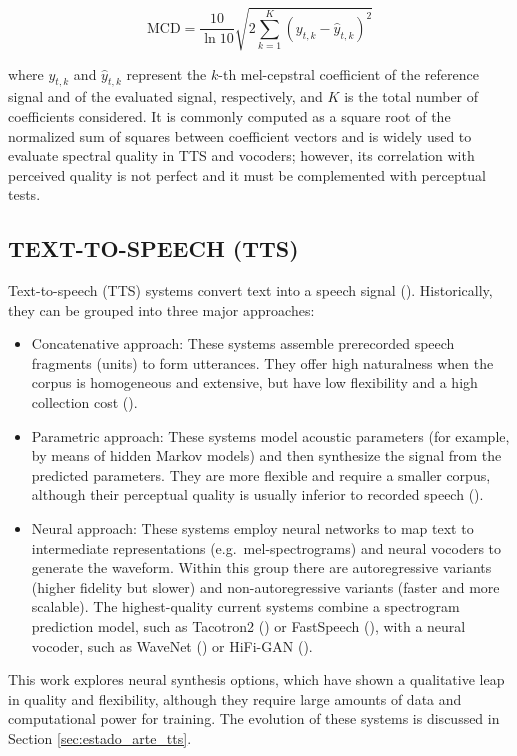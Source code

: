 \begin{equation}
    \label{eq:mcd}
    \text{MCD} = \frac{10}{\ln 10} \sqrt{2 \sum_{k=1}^{K} (y_{t,k} - \hat{y}_{t,k})^2}
\end{equation}

where $y_{t,k}$ and $\hat{y}_{t,k}$ represent the $k$-th mel-cepstral coefficient of the reference signal and of the evaluated signal, respectively, and $K$ is the total number of coefficients considered. It is commonly computed as a square root of the normalized sum of squares between coefficient vectors and is widely used to evaluate spectral quality in TTS and vocoders; however, its correlation with perceived quality is not perfect and it must be complemented with perceptual tests.

\subsection{TEXT-TO-SPEECH (TTS)}
Text-to-speech (TTS) systems convert text into a speech signal (\cite{survey1}).
Historically, they can be grouped into three major approaches:

\begin{itemize}
    \item Concatenative approach: These systems assemble prerecorded speech fragments (units) to form utterances. They offer high naturalness when the corpus is homogeneous and extensive, but have low flexibility and a high collection cost (\cite{concatenative}).
    \item Parametric approach: These systems model acoustic parameters (for example, by means of hidden Markov models) and then synthesize the signal from the predicted parameters. They are more flexible and require a smaller corpus, although their perceptual quality is usually inferior to recorded speech (\cite{parametrico}).
    \item Neural approach: These systems employ neural networks to map text to intermediate representations (e.g.\ mel-spectrograms) and neural vocoders to generate the waveform. Within this group there are autoregressive variants (higher fidelity but slower) and non-autoregressive variants (faster and more scalable). The highest-quality current systems combine a spectrogram prediction model, such as Tacotron2 (\cite{tacotron}) or FastSpeech (\cite{fastspeech}), with a neural vocoder, such as WaveNet (\cite{wavenet}) or HiFi-GAN (\cite{hifigan}).
\end{itemize}

 This work explores neural synthesis options, which have shown a qualitative leap in quality and flexibility, although they require large amounts of data and computational power for training. The evolution of these systems is discussed in Section \ref{sec:estado_arte_tts}.

